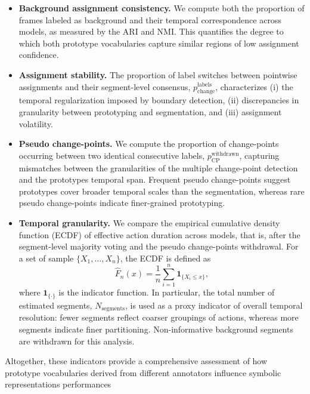 \begin{itemize}
                \item \textbf{Background assignment consistency.}  
                We compute both the proportion of frames labeled as background and their temporal correspondence across models, as measured by the ARI and NMI. This quantifies the degree to which both prototype vocabularies capture similar regions of low assignment confidence.

                \item \textbf{Assignment stability.}  
                The proportion of label switches between pointwise assignments and their segment-level consensus, $p^{\text{labels}}_{\text{change}}$, characterizes (i) the temporal regularization imposed by boundary detection, (ii) discrepancies in granularity between prototyping and segmentation, and (iii) assignment volatility. 

                \item \textbf{Pseudo change-points.}  
                We compute the proportion of change-points occurring between two identical consecutive labels, $p^{\text{withdrawn}}_{\text{CP}}$, capturing mismatches between the granularities of the multiple change-point detection and the prototypes temporal span. Frequent pseudo change-points suggest prototypes cover broader temporal scales than the segmentation, whereas rare pseudo change-points indicate finer-grained prototyping.%

                \item \textbf{Temporal granularity.}
                We compare the empirical cumulative density function (ECDF) of effective action duration across models, that is, after the segment-level majority voting and the pseudo change-points withdrawal. For a set of sample $\{X_1, \dots, X_n\}$, the ECDF is defined as \[ \hat{F}_n(x) = \frac{1}{n} \sum_{i=1}^n \mathbf{1}_{\{X_i \leq x\}},\] where $\mathbf{1}_{\{\cdot\}}$ is the indicator function. In particular, the total number of estimated segments, $N_\text{segments}$, is used as a proxy indicator of overall temporal resolution: fewer segments reflect coarser groupings of actions, whereas more segments indicate finer partitioning. Non-informative background segments are withdrawn for this analysis.

            \end{itemize}

            Altogether, these indicators provide a comprehensive assessment of how prototype vocabularies derived from different annotators influence symbolic representations performances


